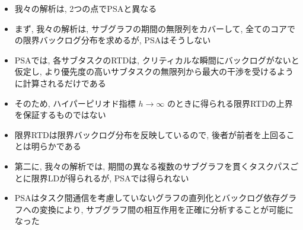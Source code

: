 \begin{frame}{}
    \begin{itemize}
        \item 我々の解析は, 2つの点でPSAと異なる
\item まず, 我々の解析は, サブグラフの期間の無限列をカバーして, 全てのコアでの限界バックログ分布を求めるが, PSAはそうしない
\item PSAでは, 各サブタスクのRTDは, クリティカルな瞬間にバックログがないと仮定し, より優先度の高いサブタスクの無限列から最大の干渉を受けるように計算されるだけである
\item そのため, ハイパーピリオド指標 $h \rightarrow \infty$ のときに得られる限界RTDの上界を保証するものではない
\item 限界RTDは限界バックログ分布を反映しているので, 後者が前者を上回ることは明らかである
\item 第二に, 我々の解析では, 期間の異なる複数のサブグラフを貫くタスクパスごとに限界LDが得られるが, PSAでは得られない
\item PSAはタスク間通信を考慮していないグラフの直列化とバックログ依存グラフへの変換により, サブグラフ間の相互作用を正確に分析することが可能になった
    \end{itemize}
\end{frame}
